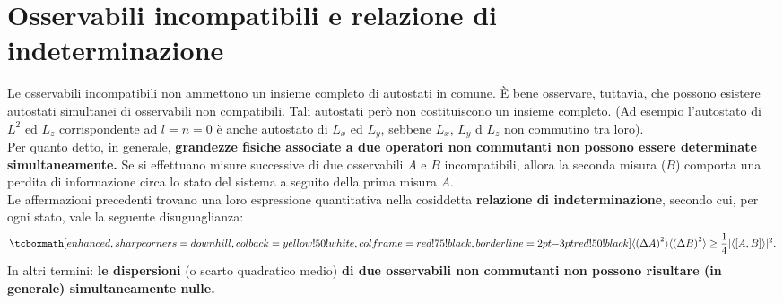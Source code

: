 \documentclass[a4paper,12pt,oneside]{book}
\begin{document}
\section[Osservabili incompatibili e relazione di indeterminazione]{Osservabili incompatibili e relazione di\\ indeterminazione}
Le osservabili incompatibili non ammettono un insieme completo di autostati in comune. È bene osservare, tuttavia, che possono esistere autostati simultanei di osservabili non compatibili. Tali autostati però non costituiscono un insieme completo. (Ad esempio l'autostato di $L^2$ ed $L_z$ corrispondente ad $l=n=0$ è anche autostato di $L_x$ ed $L_y$, sebbene $L_x$, $L_y$ d $L_z$ non commutino tra loro).\\

Per quanto detto, in generale, \textbf{grandezze fisiche associate a due operatori non commutanti non possono essere determinate simultaneamente.} Se si effettuano misure successive di due osservabili $A$ e $B$ incompatibili, allora la seconda misura ($B$) comporta una perdita di informazione circa lo stato del sistema a seguito della prima misura $A$.\\

Le affermazioni precedenti trovano una loro espressione quantitativa nella cosiddetta \textbf{relazione di indeterminazione}, secondo cui, per ogni stato, vale la seguente disuguaglianza:
	\begin{equation}
		\label{eq:cap4_2}
		\tcboxmath[enhanced,sharp corners=downhill ,colback=yellow!50!white,colframe=red!75!black, borderline={2pt}{-3pt}{red!50!black}]{
			\langle \left( \Delta A \right) ^2 \rangle \langle \left( \Delta B \right) ^2 \rangle \geq\frac{1}{4}\vert \langle \left[A,B \right] \rangle \vert ^2.
			}
	\end{equation}
In altri termini: \textbf{le dispersioni} (o scarto quadratico medio) \textbf{di due osservabili non commutanti non possono risultare (in generale) simultaneamente nulle.}\\
\end{document}
